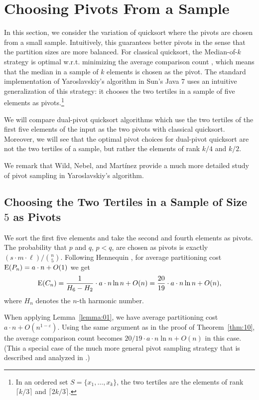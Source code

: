 \documentclass[prodmode,acmtalg]{acmsmall}
\newcommand{\E}{\textnormal{\textrm{E}}}
\begin{document}
\section{Choosing Pivots From a Sample}\label{sec:pivot:sample}
In this section, we consider the variation of quicksort where the pivots
are chosen from a small sample. Intuitively, this guarantees better pivots 
in the sense that  the partition sizes are more balanced.
For classical quicksort, the Median-of-$k$ strategy is optimal
w.r.t. minimizing the average comparison count \cite{MartinezR01}, which means that
the median in a sample of $k$ elements is chosen as the pivot. The standard
implementation of Yaroslavskiy's algorithm in Sun's Java 7 uses an 
intuitive generalization of this strategy: it chooses the two
tertiles in a sample of five elements as pivots.\footnote{
    In an ordered set $S = \{x_1,\ldots,x_k\}$, the two tertiles are the elements of 
rank $\lceil k/3\rceil$ and $\lceil 2k/3\rceil$.}

We will compare dual-pivot quicksort algorithms which use the two tertiles of the 
first five elements of the input as the two pivots with classical quicksort. 
Moreover, we will see that the optimal pivot choices for dual-pivot quicksort 
are not the two tertiles of
a sample, but rather the elements of rank $k/4$ and $k/2$. 

We remark that Wild, Nebel, and Mart\'inez \cite{WildNM14} provide a much more 
detailed study of pivot sampling in Yaroslavskiy's algorithm. 

\subsection{Choosing the Two Tertiles in a Sample of Size $5$ as Pivots}

We sort the first five elements and take the second and fourth elements as pivots.
The probability that $p$ and $q$, $p<q$,
are chosen as pivots is exactly $(s \cdot m \cdot \ell)/\binom{n}{5}.$ Following
Hennequin \cite[pp. 52--53]{hennequin}, for average partitioning cost $\E(P_n)
= a \cdot n + O(1)$ we get 
\begin{equation}\label{eq:1000}
    \E(C_n) = \frac{1}{H_6 - H_2} \cdot a \cdot n \ln n  + O(n)= \frac{20}{19} \cdot a \cdot n \ln n + O(n),
\end{equation} 
where $H_n$ denotes the $n$-th harmonic number. 

When applying Lemma~\ref{lemma:01}, we have average partitioning cost $a
\cdot n + O(n^{1 - \varepsilon})$. Using the same argument as in the proof of
Theorem~\ref{thm:10}, the average comparison count becomes $20/19\cdot a \cdot
n \ln n + O(n)$ in this case. (This a special case of the much more general 
pivot sampling strategy that is described and analyzed in \cite[Theorem 6.2]{WildNM14}.) 
\end{document}
